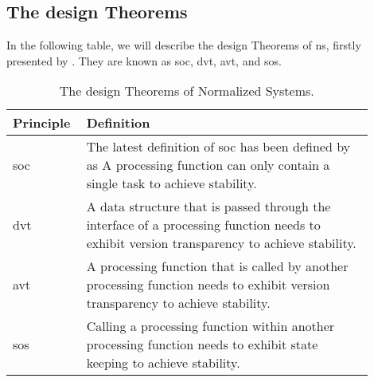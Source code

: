 \subsection{The design Theorems} \label{subsec_ns_desing_theorems}

In the following table, we will describe the design Theorems of \gls{ns}, firstly presented
by \textcite[111-119]{mannaert_normalized_2009}. They are known as \gls{soc}, \gls{dvt},
\gls{avt}, and \gls{sos}.

\begin{table}[H]
    \begin{tabular}{ p{0.15\linewidth} p{0.75\linewidth}}
        \hline
        \textbf{Principle} & \textbf{Definition} \\ 
        \hline
        \acrshort*{soc} & The latest definition of \gls{soc} has been defined by
        \textcite[274]{mannaert_normalized_2016} as A processing function can only contain
        a single task to achieve stability. \\
        
        \acrshort{dvt} &  A data structure that is passed through the interface of a processing function needs to
        exhibit version transparency to achieve stability.\\
        
        \acrshort{avt} & A processing function that is called by another processing
        function needs to exhibit version transparency to achieve stability.\\
        
        \acrshort{sos} & Calling a processing function within another processing function needs to exhibit state
        keeping to achieve stability.\\
        
        \bottomrule
    \end{tabular}
    \caption{The design Theorems of Normalized Systems.}
    \label{ns_principles}
\end{table}